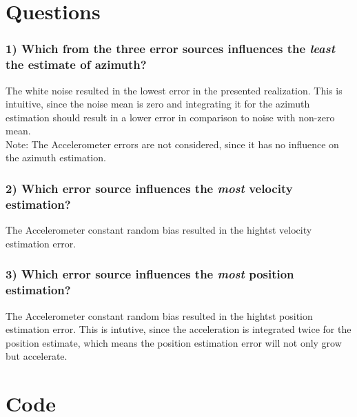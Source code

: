 \documentclass{article}
\begin{document}
\section*{Questions}

\subsubsection*{1) Which from the three error sources influences the \textit{least} the estimate of azimuth?}
The white noise resulted in the lowest error in the presented realization.
This is intuitive, since the noise mean is zero and integrating it for the azimuth
estimation should result in a lower error in comparison to noise with non-zero mean.
\\
Note: The Accelerometer errors are not considered, since it has no influence on the azimuth estimation.

\subsubsection*{2) Which error source influences the \textit{most} velocity estimation?}
The Accelerometer constant random bias resulted in the hightst velocity estimation error.

\subsubsection*{3) Which error source influences the \textit{most} position estimation?}
The Accelerometer constant random bias resulted in the hightst position estimation error.
This is intutive, since the acceleration is integrated twice for the position estimate, which means the position estimation error will not only grow but accelerate.

\section*{Code}

\end{document}
